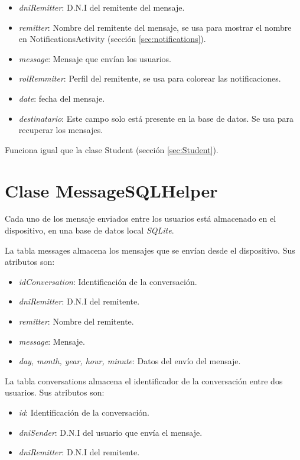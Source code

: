 		\begin{itemize}
			\setlength{\itemsep}{1pt}
			\setlength{\parskip}{0pt}
			\setlength{\parsep}{0pt}
			\item {\it dniRemitter}: D.N.I del remitente del mensaje.
			\item {\it remitter}: Nombre del remitente del mensaje, se usa para mostrar el nombre en {\ttfamily NotificationsActivity} (sección \ref{sec:notifications}).
			\item {\it message}: Mensaje que envían los usuarios.
			\item {\it rolRemmiter}: Perfil del remitente, se usa para colorear las notificaciones.
			\item {\it date}: fecha del mensaje.
			\item {\it destinatario}: Este campo solo está presente en la base de datos. Se usa para recuperar los mensajes.
		\end{itemize}
		
		Funciona igual que la clase {\ttfamily Student} (sección \ref{sec:Student}).
		
	\section{Clase {\ttfamily MessageSQLHelper}}
		Cada uno de los mensaje enviados entre los usuarios está almacenado en el dispositivo, en una base de datos local {\it SQLite}\cite{13:sqlite:online}.
		
		\bigskip
		La tabla {\ttfamily messages} almacena los mensajes que se envían desde el dispositivo. Sus atributos son:
		
		\begin{itemize}
			\setlength{\itemsep}{1pt}
			\setlength{\parskip}{0pt}
			\setlength{\parsep}{0pt}
			\item {\it idConversation}: Identificación de la conversación.
			\item {\it dniRemitter}: D.N.I del remitente.
			\item {\it remitter}: Nombre del remitente.
			\item {\it message}: Mensaje. 
			\item {\it day, month, year, hour, minute}: Datos del envío del mensaje.
		\end{itemize}
		
		\bigskip
		La tabla {\ttfamily conversations} almacena el identificador de la conversación entre dos usuarios.
		Sus atributos son:
		
		\begin{itemize}
			\setlength{\itemsep}{1pt}
			\setlength{\parskip}{0pt}
			\setlength{\parsep}{0pt}
			\item {\it id}: Identificación de la conversación.
			\item {\it dniSender}: D.N.I del usuario que envía el mensaje.
			\item {\it dniRemitter}: D.N.I del remitente.
		\end{itemize}
		
